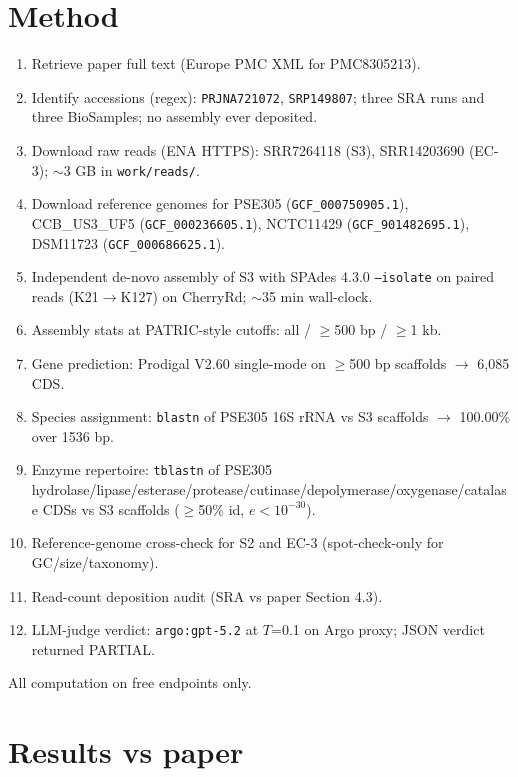 \documentclass[11pt]{article}
\begin{document}
\section{Method}
\begin{enumerate}
\item Retrieve paper full text (Europe PMC XML for PMC8305213).
\item Identify accessions (regex): \texttt{PRJNA721072}, \texttt{SRP149807}; three SRA runs and three BioSamples; no assembly ever deposited.
\item Download raw reads (ENA HTTPS): SRR7264118 (S3), SRR14203690 (EC-3); $\sim$3 GB in \texttt{work/reads/}.
\item Download reference genomes for PSE305 (\texttt{GCF\_000750905.1}), CCB\_US3\_UF5 (\texttt{GCF\_000236605.1}), NCTC11429 (\texttt{GCF\_901482695.1}), DSM11723 (\texttt{GCF\_000686625.1}).
\item Independent de-novo assembly of S3 with SPAdes 4.3.0 \texttt{--isolate} on paired reads (K21$\rightarrow$K127) on CherryRd; $\sim$35 min wall-clock.
\item Assembly stats at PATRIC-style cutoffs: all / $\geq$500 bp / $\geq$1 kb.
\item Gene prediction: Prodigal V2.60 single-mode on $\geq$500 bp scaffolds $\rightarrow$ 6{,}085 CDS.
\item Species assignment: \texttt{blastn} of PSE305 16S rRNA vs S3 scaffolds $\rightarrow$ 100.00\% over 1536 bp.
\item Enzyme repertoire: \texttt{tblastn} of PSE305 hydrolase/lipase/esterase/protease/cutinase/depolymerase/oxygenase/catalase CDSs vs S3 scaffolds ($\geq$50\% id, $e<10^{-30}$).
\item Reference-genome cross-check for S2 and EC-3 (spot-check-only for GC/size/taxonomy).
\item Read-count deposition audit (SRA vs paper Section 4.3).
\item LLM-judge verdict: \texttt{argo:gpt-5.2} at $T$=0.1 on Argo proxy; JSON verdict returned PARTIAL.
\end{enumerate}
All computation on free endpoints only.

\section{Results vs paper}
\end{document}
